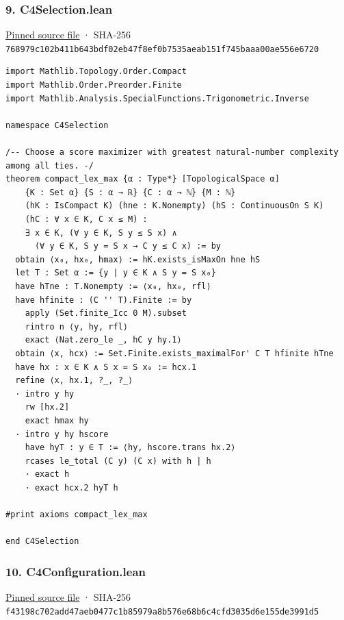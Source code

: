 \documentclass[11pt,a4paper]{article}
\begin{document}
\subsubsection{9. C4Selection.lean}\label{c4selection.lean}

\href{https://github.com/mpelteshki/climbing-to-the-frontier/blob/29fbb70da18564048f62492e43870f2f96a65463/cagent/p1/C4Selection.lean}{Pinned source file} · SHA-256 \texttt{768979c1\allowbreak{}02b411b6\allowbreak{}43bdf02e\allowbreak{}b47f8ef0\allowbreak{}b7535aea\allowbreak{}b151f745\allowbreak{}baaa00ae\allowbreak{}556e6720}

\begin{Verbatim}[breaklines,breakanywhere,fontsize=\footnotesize]
import Mathlib.Topology.Order.Compact
import Mathlib.Order.Preorder.Finite
import Mathlib.Analysis.SpecialFunctions.Trigonometric.Inverse

namespace C4Selection

/-- Choose a score maximizer with greatest natural-number complexity among all ties. -/
theorem compact_lex_max {α : Type*} [TopologicalSpace α]
    {K : Set α} {S : α → ℝ} {C : α → ℕ} {M : ℕ}
    (hK : IsCompact K) (hne : K.Nonempty) (hS : ContinuousOn S K)
    (hC : ∀ x ∈ K, C x ≤ M) :
    ∃ x ∈ K, (∀ y ∈ K, S y ≤ S x) ∧
      (∀ y ∈ K, S y = S x → C y ≤ C x) := by
  obtain ⟨x₀, hx₀, hmax⟩ := hK.exists_isMaxOn hne hS
  let T : Set α := {y | y ∈ K ∧ S y = S x₀}
  have hTne : T.Nonempty := ⟨x₀, hx₀, rfl⟩
  have hfinite : (C '' T).Finite := by
    apply (Set.finite_Icc 0 M).subset
    rintro n ⟨y, hy, rfl⟩
    exact ⟨Nat.zero_le _, hC y hy.1⟩
  obtain ⟨x, hcx⟩ := Set.Finite.exists_maximalFor' C T hfinite hTne
  have hx : x ∈ K ∧ S x = S x₀ := hcx.1
  refine ⟨x, hx.1, ?_, ?_⟩
  · intro y hy
    rw [hx.2]
    exact hmax hy
  · intro y hy hscore
    have hyT : y ∈ T := ⟨hy, hscore.trans hx.2⟩
    rcases le_total (C y) (C x) with h | h
    · exact h
    · exact hcx.2 hyT h

#print axioms compact_lex_max

end C4Selection
\end{Verbatim}

\subsubsection{10. C4Configuration.lean}\label{c4configuration.lean}

\href{https://github.com/mpelteshki/climbing-to-the-frontier/blob/29fbb70da18564048f62492e43870f2f96a65463/cagent/p1/C4Configuration.lean}{Pinned source file} · SHA-256 \texttt{f43198c7\allowbreak{}02add47a\allowbreak{}eb0477c1\allowbreak{}b85979a8\allowbreak{}b576e68b\allowbreak{}6c4cfd30\allowbreak{}35d6e155\allowbreak{}de3991d5}
\end{document}
